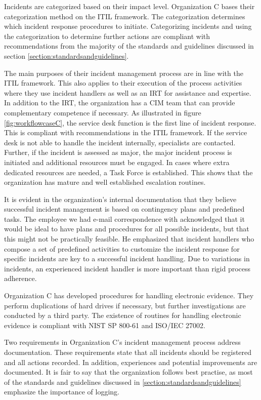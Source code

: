 Incidents are categorized based on their impact level. Organization C bases their categorization method on the ITIL framework. The categorization determines which incident response procedures to initiate. Categorizing incidents and using the categorization to determine further actions are compliant with recommendations from the majority of the standards and guidelines discussed in section \ref{section:standardsandguidelines}.

The main purposes of their incident management process are in line with the ITIL framework. This also applies to their execution of the process activities where they use incident handlers as well as an \ac{IRT} for assistance and expertise. In addition to the IRT, the organization has a \ac{CIM} team that can provide complementary competence if necessary. As illustrated in figure \ref{fig:workflowcaseC}, the service desk function is the first line of incident response. This is compliant with recommendations in the ITIL framework. If the service desk is not able to handle the incident internally, specialists are contacted. Further, if the incident is assessed as major, the major incident process is initiated and additional resources must be engaged. In cases where extra dedicated resources are needed, a Task Force is established. This shows that the organization has mature and well established escalation routines.

It is evident in the organization's internal documentation that they believe successful incident management is based on contingency plans and predefined tasks. The employee we had e-mail correspondence with acknowledged that it would be ideal to have plans and procedures for all possible incidents, but that this might not be practically feasible. He emphasized that incident handlers who compose a set of predefined activities to customize the incident response for specific incidents are key to a successful incident handling. Due to variations in incidents, an experienced incident handler is more important than rigid process adherence.

Organization C has developed procedures for handling electronic evidence. They perform duplications of hard drives if necessary, but further investigations are conducted by a third party. The existence of routines for handling electronic evidence is compliant with NIST SP 800-61 and ISO/IEC 27002.

Two requirements in Organization C's incident management process address documentation. These requirements state that all incidents should be registered and all actions recorded. In addition, experiences and potential improvements are documented. It is fair to say that the organization follows best practise, as most of the standards and guidelines discussed in \ref{section:standardsandguidelines} emphasize the importance of logging.

